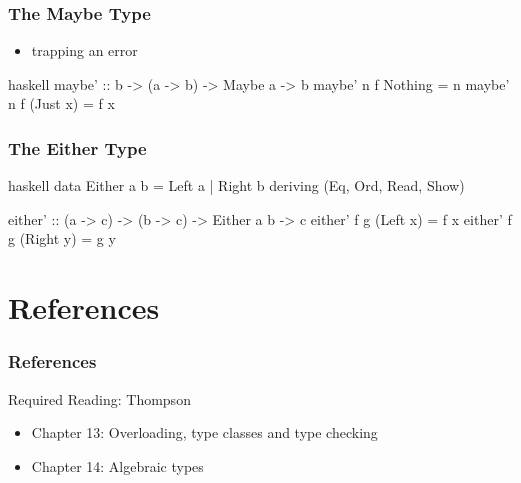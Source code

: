 \documentclass[dvipsnames]{beamer}
\theoremstyle{plain}
\begin{document}
\begin{frame}[fragile]
  \frametitle{The Maybe Type}

  \begin{itemize}
    \item trapping an error
  \end{itemize}

  \begin{exampleblock}{}
    \begin{pygments}{haskell}
maybe' :: b -> (a -> b) -> Maybe a -> b
maybe' n f Nothing  = n
maybe' n f (Just x) = f x
    \end{pygments}
  \end{exampleblock}
\end{frame}

\begin{frame}[fragile]
  \frametitle{The Either Type}

  \begin{exampleblock}{}
    \begin{pygments}{haskell}
data Either a b = Left a | Right b
                  deriving (Eq, Ord, Read, Show)

either' :: (a -> c) -> (b -> c) -> Either a b -> c
either' f g (Left x)  = f x
either' f g (Right y) = g y
    \end{pygments}
  \end{exampleblock}
\end{frame}


\section*{References}

\begin{frame}
  \frametitle{References}

  \begin{block}{Required Reading: Thompson}
    \begin{itemize}
      \item Chapter 13: \alert{Overloading, type classes and type checking}
      \item Chapter 14: \alert{Algebraic types}
    \end{itemize}
  \end{block}
\end{frame}
\end{document}
